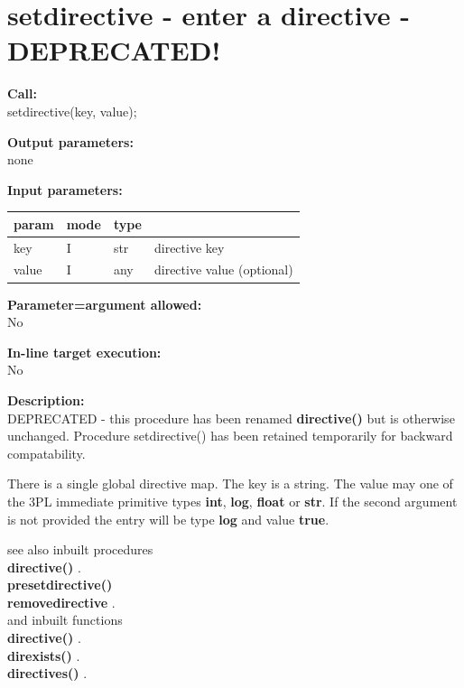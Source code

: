     \section{setdirective - enter a directive - DEPRECATED!}\label{sec:ipsetdirective}
        
        {\bf Call:} \\
        setdirective(key, value);
        
        {\bf Output parameters:} \\
        none
        
        {\bf Input parameters:} \\
        \begin{tabular}{| l | l | l | l |}
        \hline
        param  & mode     & type  & \\
        \hline \hline
        key   & I & str & directive key                 \\ \hline
        value & I & any & directive value (optional)    \\ \hline
        \end{tabular}
        
        {\bf Parameter=argument allowed:} \\
        No
        
        {\bf In-line target execution:} \\
        No
        
        {\bf Description:} \\
        DEPRECATED - this procedure has been renamed {\bf directive()} but is
        otherwise unchanged. Procedure setdirective() has been retained
        temporarily for backward compatability.
        
        There is a single global directive map. The key is a string.  The value
        may one of the 3PL immediate primitive types {\bf int}, {\bf log}, {\bf
        float} or {\bf str}. If the second argument is not provided the entry
        will be type {\bf log} and value {\bf true}.
                
        see also inbuilt procedures \\
        {\bf directive()} .\\
        {\bf presetdirective()}  \\
        {\bf removedirective} . \\
        and inbuilt functions \\
        {\bf directive()} .\\
        {\bf direxists()} .\\
        {\bf directives()} .


